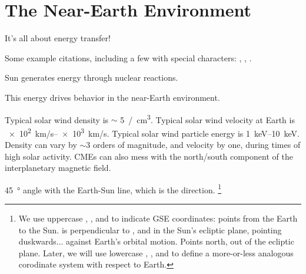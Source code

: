 
\chapter{The Near-Earth Environment}
\label{ch_intro}

It's all about energy transfer! 

Some example citations, including a few with special characters: \cite{dai_2013}, \cite{dai_2015}, \cite{lysak_2001}. 





Sun generates energy through nuclear reactions. 

This energy drives behavior in the near-Earth environment. 

Typical solar wind density is $\sim$ \SI{5}{/\cm\cubed}. Typical solar wind velocity at Earth is \SIrange{e2}{e3}{\km/\s}. Typical solar wind particle energy is \SIrange{1}{10}{\kilo\eV}. Density can vary by $\sim$3 orders of magnitude, and velocity by one, during times of high solar activity. CMEs can also mess with the north/south component of the interplanetary magnetic field. 

\SI{45}{\degree} angle with the Earth-Sun line, which is the \X direction. 
\footnote{We use uppercase \X, \Y, and \Z to indicate GSE coordinates: \X points from the Earth to the Sun. \Y is perpendicular to \X, and in the Sun's ecliptic plane, pointing duskwards... against Earth's orbital motion. Points north, out of the ecliptic plane. Later, we will use lowercase \x, \y, and \z to define a more-or-less analogous corodinate system with respect to Earth.}

